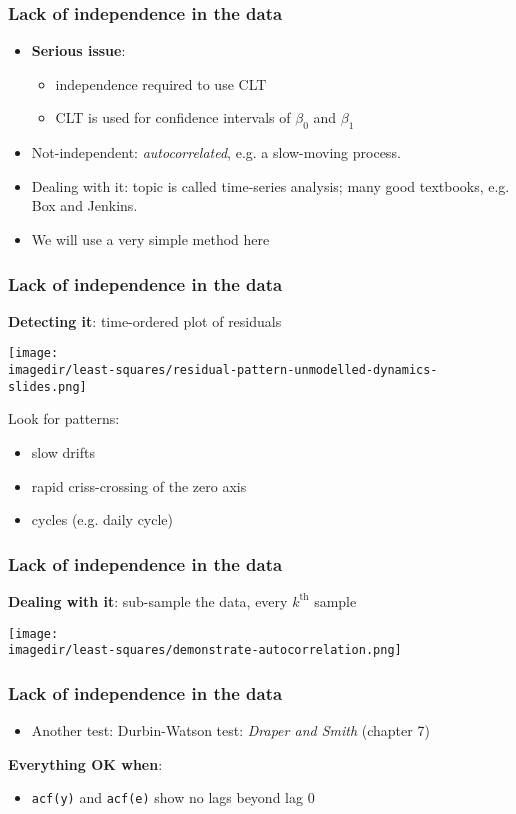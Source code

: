 \begin{frame}\frametitle{Lack of independence in the data}
	\begin{itemize}
		\item	\textbf{Serious issue}: 
		\begin{itemize}
			\item	independence required to use CLT 
			\item	CLT is used for confidence intervals of $\beta_0$ and $\beta_1$ 
		\end{itemize}
		\item	Not-independent: \emph{autocorrelated}, e.g. a slow-moving process. 
		\item	Dealing with it: topic is called time-series analysis; many good textbooks, e.g. Box and Jenkins. 
		\item	We will use a very simple method here 
	\end{itemize}
\end{frame}

\begin{frame}\frametitle{Lack of independence in the data}
	
	\textbf{Detecting it}: time-ordered plot of residuals
	\begin{center}
		\texttt{[image: \\imagedir/least-squares/residual-pattern-unmodelled-dynamics-slides.png]}
	\end{center}
	Look for patterns: 
	\begin{itemize}
		\item	slow drifts 
		\item	rapid criss-crossing of the zero axis 
		\item	cycles (e.g. daily cycle) 
	\end{itemize}
\end{frame}

\begin{frame}\frametitle{Lack of independence in the data}
	
	\textbf{Dealing with it}: sub-sample the data, every $k^\text{th}$ sample 
	\begin{center}
		\texttt{[image: \\imagedir/least-squares/demonstrate-autocorrelation.png]}
	\end{center}
\end{frame}

\begin{frame}\frametitle{Lack of independence in the data}
	\begin{itemize}
		\item	Another test: Durbin-Watson test: \emph{Draper and Smith} (chapter 7) 
	\end{itemize}
	
	\textbf{Everything OK when}: 
	\begin{itemize}
		\item	\texttt{acf(y)} and \texttt{acf(e)} show no lags beyond lag 0 
	\end{itemize}
\end{frame}


